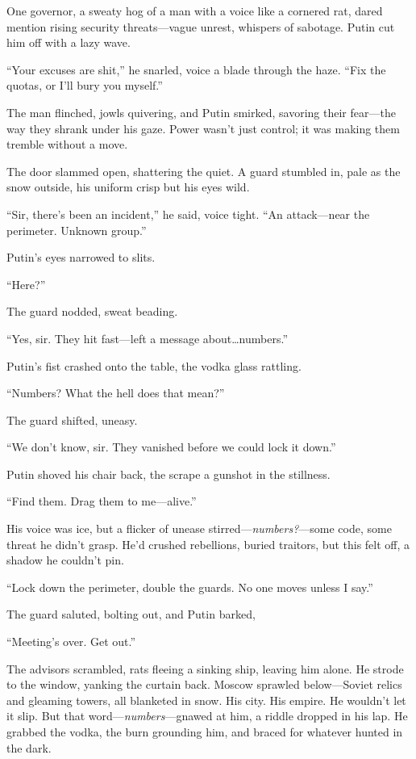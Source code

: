 \documentclass[12pt]{book}
\begin{document}
One governor, a sweaty hog of a man with a voice like a cornered rat, dared mention rising security threats---vague unrest, whispers of sabotage. Putin cut him off with a lazy wave.

\enquote{Your excuses are shit,} he snarled, voice a blade through the haze. \enquote{Fix the quotas, or I’ll bury you myself.}

The man flinched, jowls quivering, and Putin smirked, savoring their fear---the way they shrank under his gaze. Power wasn’t just control; it was making them tremble without a move.

The door slammed open, shattering the quiet. A guard stumbled in, pale as the snow outside, his uniform crisp but his eyes wild.

\enquote{Sir, there’s been an incident,} he said, voice tight. \enquote{An attack---near the perimeter. Unknown group.}

Putin’s eyes narrowed to slits.

\enquote{Here?}

The guard nodded, sweat beading.

\enquote{Yes, sir. They hit fast---left a message about\ldots numbers.}

Putin’s fist crashed onto the table, the vodka glass rattling.

\enquote{Numbers? What the hell does that mean?}

The guard shifted, uneasy.

\enquote{We don’t know, sir. They vanished before we could lock it down.}

Putin shoved his chair back, the scrape a gunshot in the stillness.

\enquote{Find them. Drag them to me---alive.}

His voice was ice, but a flicker of unease stirred---\textit{numbers?}---some code, some threat he didn’t grasp. He’d crushed rebellions, buried traitors, but this felt off, a shadow he couldn’t pin.

\enquote{Lock down the perimeter, double the guards. No one moves unless I say.}

The guard saluted, bolting out, and Putin barked,

\enquote{Meeting’s over. Get out.}

The advisors scrambled, rats fleeing a sinking ship, leaving him alone. He strode to the window, yanking the curtain back. Moscow sprawled below---Soviet relics and gleaming towers, all blanketed in snow. His city. His empire. He wouldn’t let it slip. But that word---\textit{numbers}---gnawed at him, a riddle dropped in his lap. He grabbed the vodka, the burn grounding him, and braced for whatever hunted in the dark.
\end{document}

